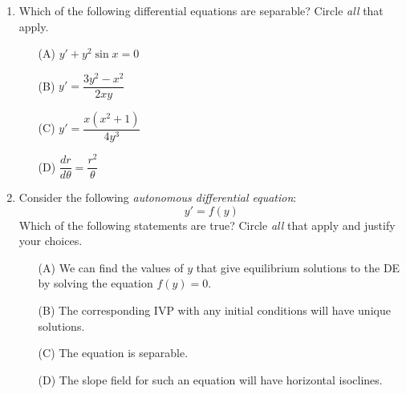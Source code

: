 \documentclass[12pt]{article}
\begin{document}
\begin{enumerate}
\begin{itemize}
\end{itemize}


\item Which of the following differential equations are separable?
Circle \textit{all} that apply.
\begin{multicols}{2}
\begin{itemize}
\item[(A)] $y' + y^2\sin x = 0$
\item[(B)] $y' = \dfrac{3y^2-x^2}{2xy}$
\item[(C)] $y' = \dfrac{x(x^2 + 1)}{4y^3}$
\item[(D)] $\dfrac{dr}{d\theta} = \dfrac{r^2}{\theta}$
\end{itemize}
\end{multicols}



\item Consider the following \textit{autonomous differential equation}:
$$y' = f(y)$$
Which of the following statements are true?
Circle \textit{all} that apply and justify your choices.
\begin{itemize}
\item[(A)] We can find the values of $y$ that give equilibrium solutions to the DE by solving the equation $f(y)=0$.
\item[(B)] The corresponding IVP with any initial conditions will have unique solutions.
\item[(C)] The equation is separable.
\item[(D)] The slope field for such an equation will have horizontal isoclines.
\end{itemize}




\end{enumerate}
\end{document}
